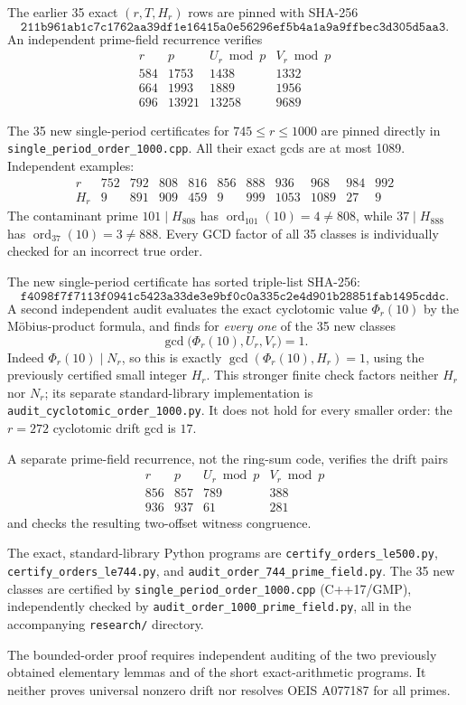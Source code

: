 \documentclass[10pt]{article}
\DeclareMathOperator{\ord}{ord}
\begin{document}
The earlier 35 exact \((r,T,H_r)\) rows are
pinned with SHA-256
\[
\texttt{211b961ab1c7c1762aa39df1e16415a0e56296ef5b4a1a9a9ffbec3d305d5aa3}.
\]
An independent prime-field recurrence verifies
\[
\begin{array}{r|r|r|r}
r&p&U_r\bmod p&V_r\bmod p\\\hline
584&1753&1438&1332\\
664&1993&1889&1956\\
696&13921&13258&9689
\end{array}
\]

The 35 new single-period certificates for \(745\le r\le1000\)
are pinned directly in \texttt{single\_period\_order\_1000.cpp}.
All their exact gcds are at most 1089. Independent examples:
\[
\begin{array}{r|rrrrrrrrrr}
r&752&792&808&816&856&888&936&968&984&992\\\hline
H_r&9&891&909&459&9&999&1053&1089&27&9
\end{array}
\]
The contaminant prime \(101\mid H_{808}\) has
\(\ord_{101}(10)=4\ne808\), while
\(37\mid H_{888}\) has \(\ord_{37}(10)=3\ne888\).
Every GCD factor of all 35 classes is individually
checked for an incorrect true order.

The new single-period certificate has sorted triple-list
SHA-256:
\[
\texttt{f4098f7f7113f0941c5423a33de3e9bf0c0a335c2e4d901b28851fab1495cddc}.
\]
A second independent audit evaluates the exact cyclotomic
value \(\Phi_r(10)\) by the M\"obius-product formula,
and finds for \emph{every one} of the 35 new classes
\[
\boxed{\gcd\bigl(\Phi_r(10),U_r,V_r\bigr)=1.}
\]
Indeed \(\Phi_r(10)\mid N_r\), so this is exactly
\(\gcd(\Phi_r(10),H_r)=1\), using the previously certified
small integer \(H_r\).
This stronger finite check factors neither \(H_r\) nor \(N_r\);
its separate standard-library implementation is
\texttt{audit\_cyclotomic\_order\_1000.py}.
It does not hold for every smaller order:
the \(r=272\) cyclotomic drift gcd is \(17\).

A separate prime-field recurrence, not the ring-sum code,
verifies the drift pairs
\[
\begin{array}{r|r|r|r}
r&p&U_r\bmod p&V_r\bmod p\\\hline
856&857&789&388\\
936&937&61&281
\end{array}
\]
and checks the resulting two-offset witness congruence.

The exact, standard-library Python programs are
\texttt{certify\_orders\_le500.py},
\texttt{certify\_orders\_le744.py},
and \texttt{audit\_order\_744\_prime\_field.py}.
The 35 new classes are certified by
\texttt{single\_period\_order\_1000.cpp}
(C++17/GMP), independently checked by
\texttt{audit\_order\_1000\_prime\_field.py},
all in the accompanying \texttt{research/} directory.

The bounded-order proof requires independent auditing of
the two previously obtained elementary lemmas and of
the short exact-arithmetic programs.
It neither proves universal nonzero drift
nor resolves OEIS A077187 for all primes.
\end{document}
